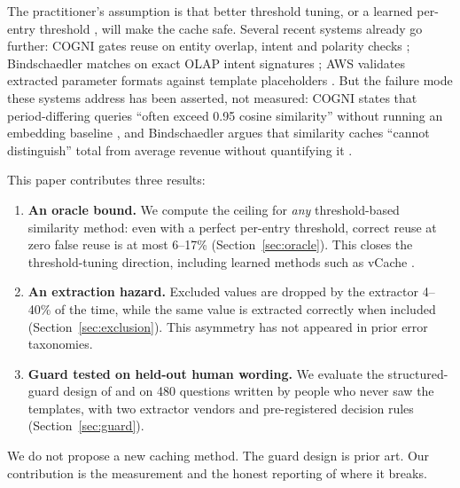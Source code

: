 \documentclass[11pt,a4paper]{article}
\begin{document}
The practitioner's assumption is that better threshold tuning, or a learned
per-entry threshold \cite{schroeder2026vcache, wang2025category}, will make
the cache safe. Several recent systems already go further: COGNI gates
reuse on entity overlap, intent and polarity checks
\cite{rathore2026cogni}; Bindschaedler matches on exact OLAP intent
signatures \cite{bindschaedler2026semantic}; AWS validates extracted
parameter formats against template placeholders \cite{brukau2026aws}. But
the failure mode these systems address has been asserted, not measured:
COGNI states that period-differing queries ``often exceed 0.95 cosine
similarity'' without running an embedding baseline
\cite{rathore2026cogni}, and Bindschaedler argues that similarity caches
``cannot distinguish'' total from average revenue without quantifying it
\cite{bindschaedler2026semantic}.

This paper contributes three results:

\begin{enumerate}[leftmargin=*,itemsep=2pt]
\item \textbf{An oracle bound.} We compute the ceiling for \emph{any}
      threshold-based similarity method: even with a perfect per-entry
      threshold, correct reuse at zero false reuse is at most 6--17\%
      (Section~\ref{sec:oracle}). This closes the threshold-tuning
      direction, including learned methods such as vCache
      \cite{schroeder2026vcache}.

\item \textbf{An extraction hazard.} Excluded values are dropped by the
      extractor 4--40\% of the time, while the same value is extracted
      correctly when included (Section~\ref{sec:exclusion}). This
      asymmetry has not appeared in prior error taxonomies.

\item \textbf{Guard tested on held-out human wording.} We evaluate the
      structured-guard design of \citet{rathore2026cogni} and
      \citet{bindschaedler2026semantic} on 480 questions written by people
      who never saw the templates, with two extractor vendors and
      pre-registered decision rules (Section~\ref{sec:guard}).
\end{enumerate}

\noindent
We do not propose a new caching method. The guard design is prior art. Our
contribution is the measurement and the honest reporting of where it
breaks.
\end{document}
